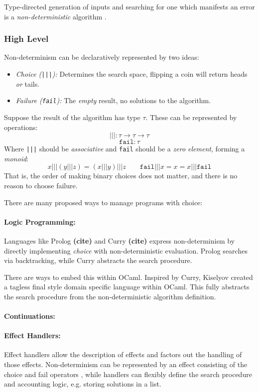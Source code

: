 Type-directed generation of inputs and searching for one which manifests an error is a \textit{non-deterministic} algorithm \cite{NondeterministicAlgorithms}. 

\subsubsection{High Level}
Non-determinism can be declaratively represented by two ideas:
\begin{itemize}
\item \textit{Choice (\texttt{|||}):} Determines the search space, flipping a coin will return heads \textit{or} tails.
\item \textit{Failure (\texttt{fail}):} The \textit{empty} result, no solutions to the algorithm.
\end{itemize}
Suppose the result of the algorithm has type $\tau$. These can be represented by operations:
\[\texttt{|||} : \tau \to \tau \to \tau\]
\[\texttt{fail} : \tau\]
Where \texttt{|||} should be \textit{associative} and \texttt{fail} should be a \textit{zero element}, forming a \textit{monoid}:
\[x \texttt{|||} (y \texttt{|||} z) = (x \texttt{|||} y) \texttt{|||} z \qquad \texttt{fail} \texttt{|||} x = x = x \texttt{|||} \texttt{fail}\]
That is, the order of making binary choices does not matter, and there is no reason to choose failure.

There are many proposed ways to manage programs with choice: 
\paragraph{Logic Programming:} Languages like Prolog \textbf{(cite)} and Curry \textbf{(cite)} express non-determinism by directly implementing \textit{choice} with non-deterministic evaluation. Prolog searches via backtracking, while Curry abstracts the search procedure.

There are ways to embed this within OCaml. Inspired by Curry, Kiselyov \cite{NondetDSL} created a tagless final style \cite{TaglessFinalDSL} domain specific language within OCaml. This fully abstracts the search procedure from the non-deterministic algorithm definition.
\paragraph{Continuations:}
\paragraph{Effect Handlers:} Effect handlers allow the description of effects and factors out the handling of those effects. Non-determinism can be represented by an effect consisting of the choice and fail operators \cite{EffectsExamples, HandlersInAction}, while handlers can flexibly define the search procedure and accounting logic, e.g. storing solutions in a list. 

